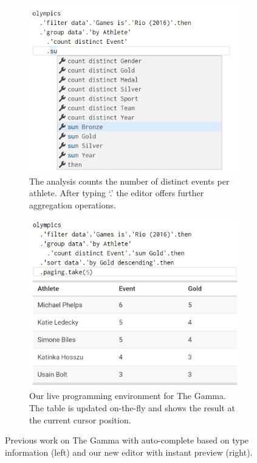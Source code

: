 \documentclass[english,crc,references=cleveref]{programming}
\theoremstyle{plain}
\theoremstyle{definition}
\begin{document}

\begin{figure}
  \begin{wide}\centering
    \begin{subfigure}{.49\linewidth}
      \includegraphics[width=\linewidth]{figures/gamma1.png}
      \caption{The analysis counts the number of distinct events per athlete.
        After typing `.' the editor offers further aggregation operations.}
  \label{fig:gamma-dot}
    \end{subfigure}\hfill
    \begin{subfigure}{.49\linewidth}
      \includegraphics[width=\linewidth]{figures/gamma2.png}
      \caption{Our live programming environment for The Gamma. The table is
        updated on-the-fly and shows the result at the current cursor
        position.}
  \label{fig:gamma-preview}
    \end{subfigure}
  \end{wide}
\caption{Previous work on The Gamma with auto-complete based on type information (left)
  and our new editor with instant preview (right).}
\label{fig:gamma-intro}
\end{figure}
\end{document}
